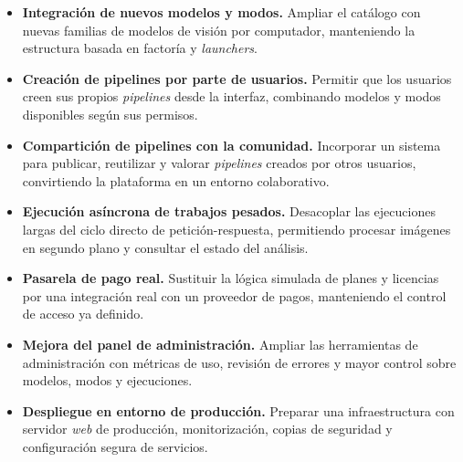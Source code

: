 \begin{itemize}
	
	\item \textbf{Integración de nuevos modelos y modos.} Ampliar el catálogo con nuevas familias de modelos de visión por computador, manteniendo la estructura basada en factoría y \textit{launchers}.
	
	\item \textbf{Creación de pipelines por parte de usuarios.} Permitir que los usuarios creen sus propios \textit{pipelines} desde la interfaz, combinando modelos y modos disponibles según sus permisos.
	
	\item \textbf{Compartición de pipelines con la comunidad.} Incorporar un sistema para publicar, reutilizar y valorar \textit{pipelines} creados por otros usuarios, convirtiendo la plataforma en un entorno colaborativo.
	
	\item \textbf{Ejecución asíncrona de trabajos pesados.} Desacoplar las ejecuciones largas del ciclo directo de petición-respuesta, permitiendo procesar imágenes en segundo plano y consultar el estado del análisis.
	
	\item \textbf{Pasarela de pago real.} Sustituir la lógica simulada de planes y licencias por una integración real con un proveedor de pagos, manteniendo el control de acceso ya definido.
	
	\item \textbf{Mejora del panel de administración.} Ampliar las herramientas de administración con métricas de uso, revisión de errores y mayor control sobre modelos, modos y ejecuciones.
	
	\item \textbf{Despliegue en entorno de producción.} Preparar una infraestructura con servidor \textit{web} de producción, monitorización, copias de seguridad y configuración segura de servicios.
\end{itemize}
